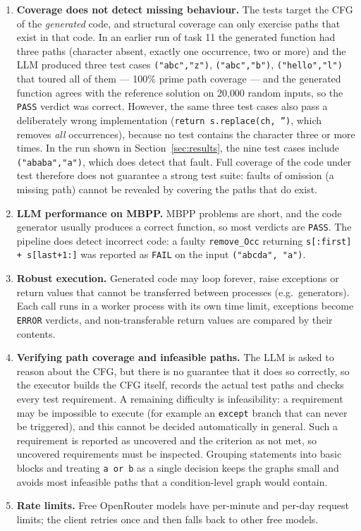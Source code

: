 \documentclass[12pt, a4paper]{article}
\begin{document}
\begin{enumerate}
    \item \textbf{Coverage does not detect missing behaviour.} The tests target the CFG of the \emph{generated} code, and structural coverage can only exercise paths that exist in that code. In an earlier run of task 11 the generated function had three paths (character absent, exactly one occurrence, two or more) and the LLM produced three test cases \texttt{("abc","z")}, \texttt{("abc","b")}, \texttt{("hello","l")} that toured all of them --- 100\% prime path coverage --- and the generated function agrees with the reference solution on 20{,}000 random inputs, so the \texttt{PASS} verdict was correct. However, the same three test cases also pass a deliberately wrong implementation (\texttt{return s.replace(ch, '')}, which removes \emph{all} occurrences), because no test contains the character three or more times. In the run shown in Section~\ref{sec:results}, the nine test cases include \texttt{("ababa","a")}, which does detect that fault. Full coverage of the code under test therefore does not guarantee a strong test suite: faults of omission (a missing path) cannot be revealed by covering the paths that do exist.

    \item \textbf{LLM performance on MBPP.} MBPP problems are short, and the code generator usually produces a correct function, so most verdicts are \texttt{PASS}. The pipeline does detect incorrect code: a faulty \texttt{remove\_Occ} returning \texttt{s[:first] + s[last+1:]} was reported as \texttt{FAIL} on the input \texttt{("abcda", "a")}.

    \item \textbf{Robust execution.} Generated code may loop forever, raise exceptions or return values that cannot be transferred between processes (e.g.\ generators). Each call runs in a worker process with its own time limit, exceptions become \texttt{ERROR} verdicts, and non-transferable return values are compared by their contents.

    \item \textbf{Verifying path coverage and infeasible paths.} The LLM is asked to reason about the CFG, but there is no guarantee that it does so correctly, so the executor builds the CFG itself, records the actual test paths and checks every test requirement. A remaining difficulty is infeasibility: a requirement may be impossible to execute (for example an \texttt{except} branch that can never be triggered), and this cannot be decided automatically in general. Such a requirement is reported as uncovered and the criterion as not met, so uncovered requirements must be inspected. Grouping statements into basic blocks and treating \texttt{a or b} as a single decision keeps the graphs small and avoids most infeasible paths that a condition-level graph would contain.

    \item \textbf{Rate limits.} Free OpenRouter models have per-minute and per-day request limits; the client retries once and then falls back to other free models.
\end{enumerate}
\end{document}
